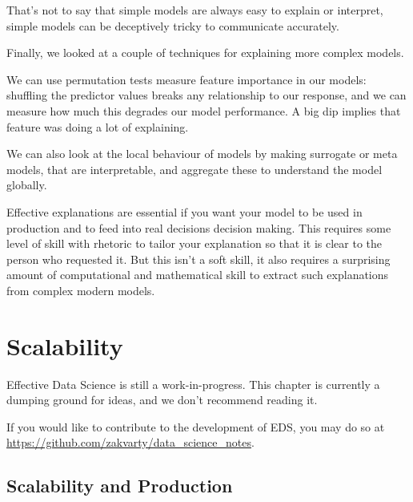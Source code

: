 \documentclass[
  letterpaper,
  DIV=11,
  numbers=noendperiod]{scrreprt}
\begin{document}
That's not to say that simple models are always easy to explain or
interpret, simple models can be deceptively tricky to communicate
accurately.

Finally, we looked at a couple of techniques for explaining more complex
models.

We can use permutation tests measure feature importance in our models:
shuffling the predictor values breaks any relationship to our response,
and we can measure how much this degrades our model performance. A big
dip implies that feature was doing a lot of explaining.

We can also look at the local behaviour of models by making surrogate or
meta models, that are interpretable, and aggregate these to understand
the model globally.

Effective explanations are essential if you want your model to be used
in production and to feed into real decisions decision making. This
requires some level of skill with rhetoric to tailor your explanation so
that it is clear to the person who requested it. But this isn't a soft
skill, it also requires a surprising amount of computational and
mathematical skill to extract such explanations from complex modern
models.

\chapter{Scalability}\label{production-scalability}

\begin{tcolorbox}[enhanced jigsaw, coltitle=black, opacityback=0, left=2mm, titlerule=0mm, breakable, colback=white, opacitybacktitle=0.6, colbacktitle=quarto-callout-important-color!10!white, bottomtitle=1mm, toptitle=1mm, colframe=quarto-callout-important-color-frame, bottomrule=.15mm, leftrule=.75mm, title=\textcolor{quarto-callout-important-color}{\faExclamation}\hspace{0.5em}{Important}, toprule=.15mm, arc=.35mm, rightrule=.15mm]

Effective Data Science is still a work-in-progress. This chapter is
currently a dumping ground for ideas, and we don't recommend reading it.

If you would like to contribute to the development of EDS, you may do so
at \url{https://github.com/zakvarty/data_science_notes}.

\end{tcolorbox}

\section{Scalability and Production}\label{scalability-and-production}
\end{document}
